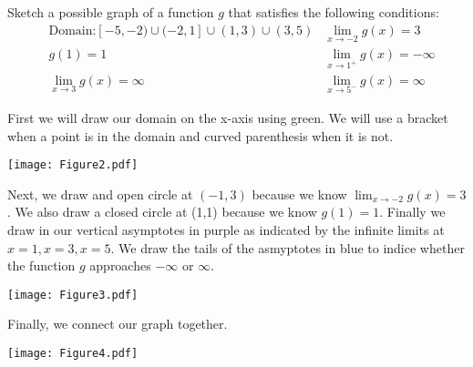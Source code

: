 \documentclass[nooutcomes, handout]{ximera}
\begin{document}
\begin{problem}
	Sketch a possible graph of a function $g$ that satisfies the following conditions:
	\begin{align*}
	&\text{Domain:} [-5,-2) \cup (-2,1] \cup (1,3) \cup (3,5)
	& \lim_{x \to -2} g(x) = 3\\
	& g(1)=1
	& \lim_{x \to 1^+} g(x) = -\infty\\
	& \lim_{x \to 3} g(x) = \infty
	& \lim_{x \to 5^-} g(x) = \infty
	\end{align*}
	\begin{freeResponse}
	First we will draw our domain on the x-axis using green.  We will use a bracket when a point is in the domain and curved parenthesis when it is not.
  \begin{center}
    \texttt{[image: Figure2.pdf]}
  \end{center}
	Next, we draw and open circle at $(-1,3)$ because we know $\lim_{x \to -2} g(x) = 3$.  We also draw a closed circle at (1,1) because we know $g(1)=1$.  Finally we draw in our vertical asymptotes in purple as indicated by the infinite limits at $x=1, x=3, x=5$.  We draw the tails of the asmyptotes in blue to indice whether the function $g$ approaches $ -\infty$ or $\infty$.
  \begin{center}
    \texttt{[image: Figure3.pdf]}
  \end{center}
	Finally, we connect our graph together.
  \begin{center}
    \texttt{[image: Figure4.pdf]}
  \end{center}
	\end{freeResponse}
\end{problem}
\end{document}

